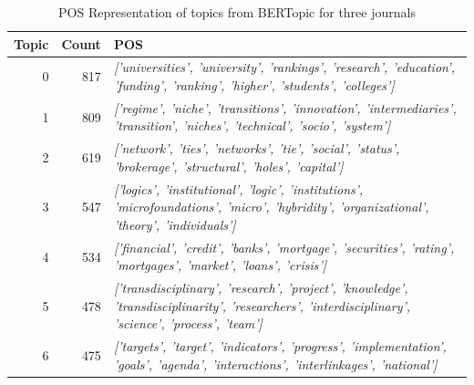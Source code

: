 \documentclass[12pt]{article}
\begin{document}
\begin{landscape}
\begin{table}[]
\small
\centering
\caption{POS Representation of topics from BERTopic for three journals}
\label{tab:pos_3j}
\begin{tabular}{rrl}
\hline
\multicolumn{1}{|l|}{\textbf{Topic}} & \multicolumn{1}{l|}{\textbf{Count}} & \multicolumn{1}{l|}{\textbf{POS}}                                                                                                                                                    \\ \hline
\multicolumn{1}{|r|}{0}              & \multicolumn{1}{r|}{817}            & \multicolumn{1}{l|}{\textit{{[}'universities', 'university', 'rankings', 'research', 'education', 'funding', 'ranking', 'higher', 'students', 'colleges'{]}}}                        \\ \hline
\multicolumn{1}{|r|}{1}              & \multicolumn{1}{r|}{809}            & \multicolumn{1}{l|}{\textit{{[}'regime', 'niche', 'transitions', 'innovation', 'intermediaries', 'transition', 'niches', 'technical', 'socio', 'system'{]}}}                         \\ \hline
\multicolumn{1}{|r|}{2}              & \multicolumn{1}{r|}{619}            & \multicolumn{1}{l|}{\textit{{[}'network', 'ties', 'networks', 'tie', 'social', 'status', 'brokerage', 'structural', 'holes', 'capital'{]}}}                                          \\ \hline
\multicolumn{1}{|r|}{3}              & \multicolumn{1}{r|}{547}            & \multicolumn{1}{l|}{\textit{{[}'logics', 'institutional', 'logic', 'institutions', 'microfoundations', 'micro', 'hybridity', 'organizational', 'theory', 'individuals'{]}}}          \\ \hline
\multicolumn{1}{|r|}{4}              & \multicolumn{1}{r|}{534}            & \multicolumn{1}{l|}{\textit{{[}'financial', 'credit', 'banks', 'mortgage', 'securities', 'rating', 'mortgages', 'market', 'loans', 'crisis'{]}}}                                     \\ \hline
\multicolumn{1}{|r|}{5}              & \multicolumn{1}{r|}{478}            & \multicolumn{1}{l|}{\textit{{[}'transdisciplinary', 'research', 'project', 'knowledge', 'transdisciplinarity', 'researchers', 'interdisciplinary', 'science', 'process', 'team'{]}}} \\ \hline
\multicolumn{1}{|r|}{6}              & \multicolumn{1}{r|}{475}            & \multicolumn{1}{l|}{\textit{{[}'targets', 'target', 'indicators', 'progress', 'implementation', 'goals', 'agenda', 'interactions', 'interlinkages', 'national'{]}}}                  \\ \hline

\end{tabular}
\end{table}
\end{landscape}
\end{document}
